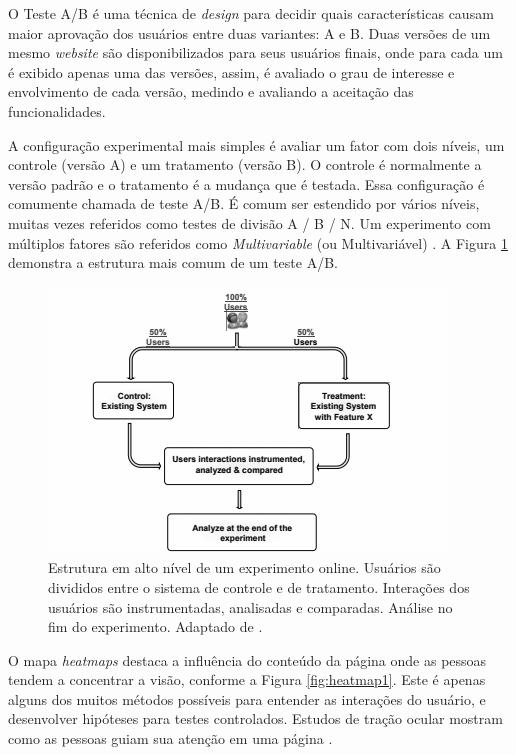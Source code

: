 \documentclass[12pt]{article}
\begin{document}
O Teste A/B é uma técnica de \textit{design} para decidir quais características causam maior aprovação dos usuários entre duas variantes: A e B. Duas versões de um mesmo \textit{website} são disponibilizados para seus usuários finais, onde para cada um é exibido apenas uma das versões, assim, é avaliado o grau de interesse e envolvimento de cada versão, medindo e avaliando a aceitação das funcionalidades.

A configuração experimental mais simples é avaliar um fator com dois níveis, um controle (versão A) e um tratamento (versão B). O controle é normalmente a versão padrão e o tratamento é a mudança que é testada. Essa configuração é comumente chamada de teste A/B. É comum ser estendido por vários níveis, muitas vezes referidos como testes de divisão A / B / N. Um experimento com
múltiplos fatores são referidos como \textit{Multivariable} (ou Multivariável) \cite{kohavi2010online}. A Figura \ref{fig:onlineExp1} demonstra a estrutura mais comum de um teste A/B.

\begin{figure}[ht]
\centering
\includegraphics[width=.8\textwidth]{fig2.png}
\caption{Estrutura em alto nível de um experimento online. Usuários são divididos entre o sistema de controle e de tratamento. Interações dos usuários são instrumentadas, analisadas e comparadas. Análise no fim do experimento. Adaptado de \cite{kohavi2010online}.}
\label{fig:onlineExp1}
\end{figure}

O mapa \textit{heatmaps} destaca a influência do conteúdo da página onde as pessoas tendem a concentrar a visão, conforme a Figura \ref{fig:heatmap1}. Este é apenas alguns dos muitos métodos possíveis para entender as interações do usuário, e desenvolver hipóteses para testes controlados. Estudos de tração ocular mostram como as pessoas guiam sua atenção em uma página \cite{goward:13}.
\end{document}
